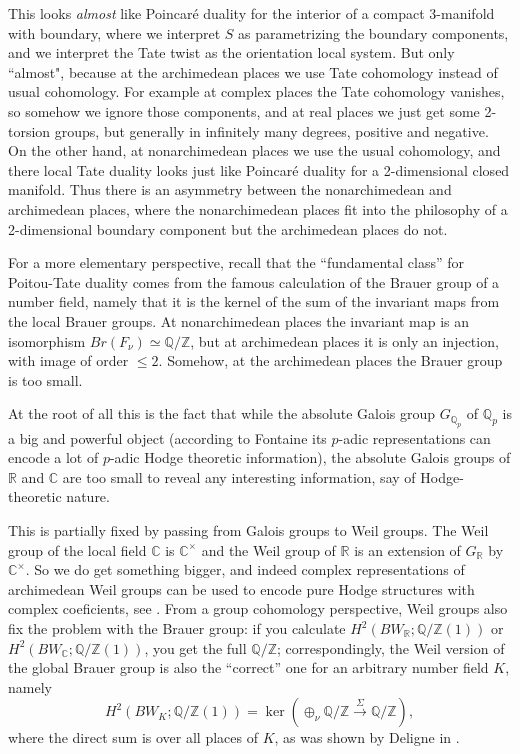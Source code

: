 \documentclass[12pt]{article}
\theoremstyle{definition}
\newcommand{\on}{\operatorname}
\newcommand{\mbb}{\mathbb}
\begin{document}
This looks \emph{almost} like Poincaré duality for the interior of a compact 3-manifold with boundary, where we interpret $S$ as parametrizing the boundary components, and we interpret the Tate twist as the orientation local system.  But only ``almost", because at the archimedean places we use Tate cohomology instead of usual cohomology.  For example at complex places the Tate cohomology vanishes, so somehow we ignore those components, and at real places we just get some 2-torsion groups, but generally in infinitely many degrees, positive and negative.  On the other hand, at nonarchimedean places we use the usual cohomology, and there local Tate duality looks just like Poincaré duality for a 2-dimensional closed manifold.  Thus there is an asymmetry between the nonarchimedean and archimedean places, where the nonarchimedean places fit into the philosophy of a 2-dimensional boundary component but the archimedean places do not.

For a more elementary perspective, recall that the ``fundamental class'' for Poitou-Tate duality comes from the famous calculation of the Brauer group of a number field, namely that it is the kernel of the sum of the invariant maps from the local Brauer groups.  At nonarchimedean places the invariant map is an isomorphism $Br(F_\nu)\simeq \mbb{Q}/\mbb{Z}$, but at archimedean places it is only an injection, with image of order $\leq 2$.  Somehow, at the archimedean places the Brauer group is too small.

At the root of all this is the fact that while the absolute Galois group $G_{\mbb{Q}_p}$ of $\mbb{Q}_p$ is a big and powerful object (according to Fontaine its $p$-adic representations can encode a lot of $p$-adic Hodge theoretic information), the absolute Galois groups of $\mbb{R}$ and $\mbb{C}$ are too small to reveal any interesting information, say of Hodge-theoretic nature.

This is partially fixed by passing from Galois groups to Weil groups.  The Weil group of the local field $\mbb{C}$ is $\mbb{C}^\times$ and the Weil group of $\mathbb{R}$ is an extension of $G_\mbb{R}$ by $\mbb{C}^\times$.  So we do get something bigger, and indeed complex representations of archimedean Weil groups can be used to encode pure Hodge structures with complex coeficients, see \cite{tatentb}.  From a group cohomology perspective, Weil groups also fix the problem with the Brauer group: if you calculate $H^2(BW_\mbb{R};\mbb{Q}/\mbb{Z}(1))$ or $H^2(BW_\mbb{C};\mbb{Q}/\mbb{Z}(1))$, you get the full $\mbb{Q}/\mbb{Z}$; correspondingly, the Weil version of the global Brauer group is also the ``correct'' one for an arbitrary number field $K$, namely
$$H^2(BW_K;\mbb{Q}/\mbb{Z}(1))=\on{ker}\left(
\oplus_\nu\mbb{Q}/\mbb{Z}\overset{\Sigma}{
\rightarrow}\mbb{Q}/\mbb{Z}\right),$$
where the direct sum is over all places of $K$, as was shown by Deligne in \cite{deligne}.
\end{document}
